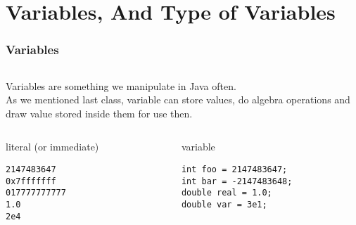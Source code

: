 \documentclass[
  11pt, %
  xcolor=dvipsnames
]{beamer}
\begin{document}
\section{Variables, And Type of Variables}
\begin{frame}[fragile]
	\frametitle{Variables}


	\begin{columns}[c]
		\begin{column}{0.9\textwidth}

			Variables are something we manipulate in Java often.\\

			As we mentioned last class, variable can store values, do algebra operations and draw value stored inside them for use then.

			\begin{columns}[c]
				\begin{column}{0.4\textwidth}

					literal (or immediate)

					\begin{lstlisting}
2147483647
0x7fffffff
017777777777
1.0
2e4
\end{lstlisting}

				\end{column}

				\begin{column}{0.4\textwidth}

					variable

					\begin{lstlisting}
int foo = 2147483647;
int bar = -2147483648;
double real = 1.0;
double var = 3e1;
\end{lstlisting}

				\end{column}
			\end{columns}

		\end{column}
	\end{columns}

\end{frame}
\end{document}
